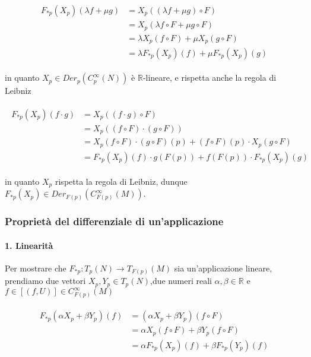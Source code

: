 \begin{align}
	\begin{split}
		F_{*p}(X_{p})(\lambda f + \mu g) &= X_{p}((\lambda f + \mu g) \circ F)\\
		&= X_{p}(\lambda f \circ F + \mu g \circ F)\\
		&= \lambda X_{p}(f \circ F) + \mu X_{p}(g \circ F)\\
		&= \lambda F_{*p}(X_{p})(f) + \mu F_{*p}(X_{p})(g)
	\end{split}
\end{align}

in quanto $ X_{p} \in Der_{p}(C_{p}^{\infty}(N)) $ è $ \mathbb{R} $-lineare, e rispetta anche la regola di Leibniz

\begin{align}
	\begin{split}
		F_{*p}(X_{p})(f \cdot g) &= X_{p}((f \cdot g) \circ F)\\
		&= X_{p}((f \circ F) \cdot (g \circ F))\\
		&= X_{p}(f \circ F) \cdot (g \circ F)(p) + (f \circ F)(p) \cdot X_{p}(g \circ F)\\
		&= F_{*p}(X_{p})(f) \cdot g(F(p)) + f(F(p)) \cdot F_{*p}(X_{p})(g)
	\end{split}
\end{align}

in quanto $ X_{p}$ rispetta la regola di Leibniz, dunque $ F_{*p}(X_{p}) \in Der_{F(p)}(C_{F(p)}^{\infty}(M)) $.

\subsubsection{Proprietà del differenziale di un'applicazione}

\paragraph{1. Linearità}

Per mostrare che $ F_{*p} : T_{p}(N) \to T_{F(p)}(M) $ sia un'applicazione lineare, prendiamo due vettori $ X_{p},Y_{p} \in T_{p}(N) $,due numeri reali $ \alpha,\beta \in \mathbb{R} $ e $ f \in [(f,U)] \in C_{F(p)}^{\infty}(M) $

\begin{align}
	\begin{split}
		F_{*p}(\alpha X_{p} + \beta Y_{p})(f) &= (\alpha X_{p} + \beta Y_{p})(f \circ F)\\
		&= \alpha X_{p}(f \circ F) + \beta Y_{p}(f \circ F)\\
		&= \alpha F_{*p}(X_{p})(f) + \beta F_{*p}(Y_{p})(f)
	\end{split}
\end{align}

